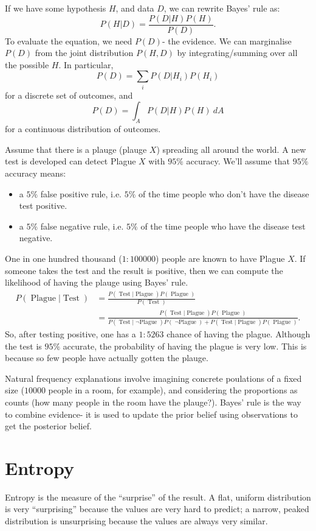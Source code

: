 \documentclass[a4paper, openany]{memoir}
\begin{document}
If we have some hypothesis $H$, and data $D$, we can rewrite Bayes' rule as:
\[P(H|D) = \frac{P(D|H)P(H)}{P(D)}.\]
To evaluate the equation, we need $P(D)$- the evidence. We can marginalise $P(D)$ from the joint distribution $P(H, D)$ by integrating/summing over all the possible $H$. In particular,
\[P(D) = \sum_i P(D|H_i) P(H_i)\]
for a discrete set of outcomes, and
\[P(D) = \int_A P(D|H) P(H) \ dA\]
for a continuous distribution of outcomes.

Assume that there is a plauge (plauge $X$) spreading all around the world. A new test is developed can detect Plague $X$ with $95\%$ accuracy. We'll assume that $95\%$ accuracy means:
\begin{itemize}
    \item a $5\%$ false positive rule, i.e. $5\%$ of the time people who don't have the disease test positive.
    \item a $5\%$ false negative rule, i.e. $5\%$ of the time people who have the disease test negative.
\end{itemize}
One in one hundred thousand ($1:100 000$) people are known to have Plague $X$. If someone takes the test and the result is positive, then we can compute the likelihood of having the plauge using Bayes' rule.
\small{\begin{align*}
    P(\operatorname{Plague}|\operatorname{Test}) &= \frac{P(\operatorname{Test}|\operatorname{Plague}) P(\operatorname{Plague})}{ P(\operatorname{Test})} \\
    &= \frac{P(\operatorname{Test}|\operatorname{Plague}) P(\operatorname{Plague})}{P(\operatorname{Test}|\operatorname{\lnot Plague})P(\operatorname{\lnot Plague}) + P(\operatorname{Test}|\operatorname{Plague})P(\operatorname{Plague})}.
\end{align*}}
So, after testing positive, one has a $1:5263$ chance of having the plague. Although the test is $95\%$ accurate, the probability of having the plague is very low. This is because so few people have actually gotten the plauge.

Natural frequency explanations involve imagining concrete poulations of a fixed size ($10 000$ people in a room, for example), and considering the proportions as counts (how many people in the room have the plauge?). Bayes' rule is the way to combine evidence- it is used to update the prior belief using observations to get the posterior belief.
\newpage

\section{Entropy}
Entropy is the measure of the ``surprise'' of the result. A flat, uniform distribution is very ``surprising'' because the values are very hard to predict; a narrow, peaked distribution is unsurprising because the values are always very similar.
\end{document}
